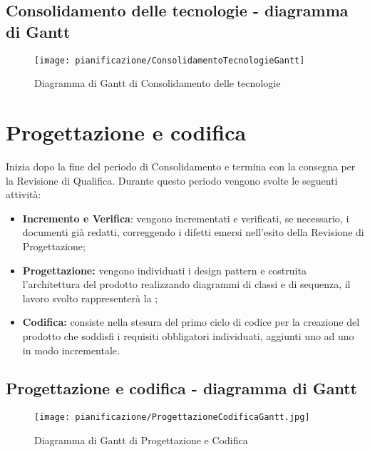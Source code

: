 \documentclass[../PianodiProgetto.tex]{subfiles}
\begin{document}
	\subsection{Consolidamento delle tecnologie - diagramma di Gantt}
	\begin{figure}[H]
		\texttt{[image: pianificazione/ConsolidamentoTecnologieGantt]}	
		\caption{Diagramma di Gantt di Consolidamento delle tecnologie}\label{fig:3}
	\end{figure}
	\newpage
	\section{Progettazione e codifica}
	Inizia dopo la fine del periodo di Consolidamento e termina con la consegna per la Revisione di Qualifica. Durante questo periodo vengono svolte le seguenti attività:
	\begin{itemize}
		\item \textbf{Incremento e Verifica}: vengono incrementati e verificati, se necessario, i documenti già redatti, correggendo i difetti emersi nell'esito della Revisione di Progettazione;	
		\item \textbf{Progettazione:} vengono individuati i design pattern e costruita l'architettura del prodotto realizzando diagrammi di classi e di sequenza, il lavoro svolto rappresenterà la ;
		\item \textbf{Codifica:} consiste nella stesura del primo ciclo di codice per la creazione del prodotto che soddisfi i requisiti obbligatori individuati, aggiunti uno ad uno in modo incrementale.
	\end{itemize}
	\subsection{Progettazione e codifica - diagramma di Gantt}
	\begin{figure}[H]
		\texttt{[image: pianificazione/ProgettazioneCodificaGantt.jpg]}	
		\caption{Diagramma di Gantt di Progettazione e Codifica}\label{fig:4}	
	\end{figure}
	\newpage
\end{document}
